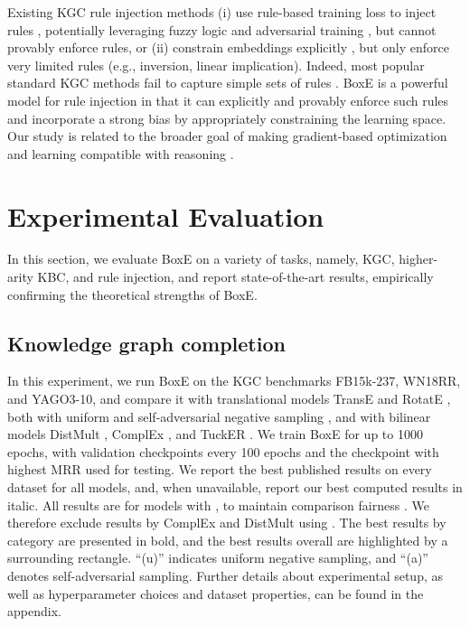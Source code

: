 \documentclass{article}
\begin{document}
Existing KGC rule injection methods (i) use rule-based training loss to inject rules \cite{demeester16,rocktaschel15}, potentially leveraging fuzzy logic \cite{guo16} and adversarial training \cite{minervini17}, but cannot provably enforce rules, or (ii) constrain embeddings explicitly \cite{ding18,rocktaschel15}, but only enforce very limited rules (e.g., inversion, linear implication). Indeed, most popular standard KGC methods fail to capture simple sets of rules \cite{Gutirrez18}. 
BoxE is a powerful model for rule injection in that it can explicitly and provably enforce such rules and incorporate a strong bias by appropriately constraining the learning space. Our study is related to the broader goal of making gradient-based optimization and learning compatible with reasoning \cite{LeCunTalk}. 

\section{Experimental Evaluation}
In this section, we evaluate BoxE on a variety of tasks, namely, KGC, higher-arity KBC, and rule injection, and report state-of-the-art results, empirically confirming the theoretical strengths of BoxE. 


\subsection{Knowledge graph completion}
\label{ssec:KGCRes}
In this experiment, we run BoxE on the KGC benchmarks FB15k-237, WN18RR, and YAGO3-10, and compare it with translational models TransE \cite{TransE-NIPS13} and RotatE \cite{RotatE-ICLR19}, both with uniform and self-adversarial negative sampling \cite{RotatE-ICLR19}, and with bilinear models DistMult \cite{DistMult-ICLR15}, ComplEx \cite{ComplEx-ICML16}, and TuckER \cite{TuckER}.
We train BoxE for up to 1000 epochs, with validation checkpoints every 100 epochs and the checkpoint with highest MRR used for testing. We report the best published results on every dataset for all models, and, when unavailable, report our best computed results in italic. All results are for models with , to maintain comparison fairness  \cite{TuckER}. We therefore exclude results by ComplEx \cite{N3Reg-ICML18} and DistMult \cite{ruffinelli2020you} using . The best results by category are presented in bold, and the best results overall are highlighted by a surrounding rectangle. ``(u)'' indicates uniform negative sampling, and ``(a)'' denotes self-adversarial sampling. Further details about experimental setup, as well as hyperparameter choices and dataset properties, can be found in the appendix.
\end{document}
